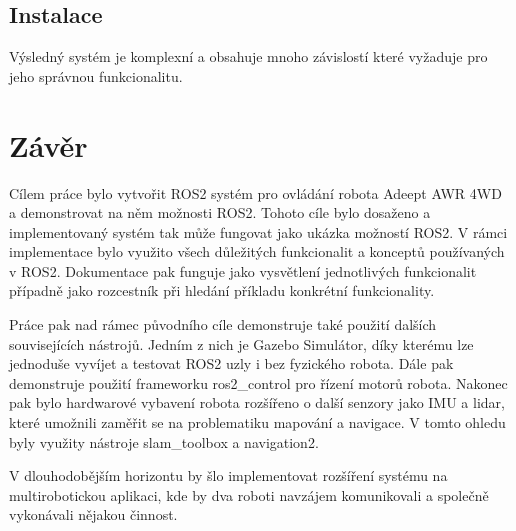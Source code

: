 \section{Instalace}
Výsledný systém je komplexní a obsahuje mnoho závislostí které vyžaduje pro jeho správnou funkcionalitu.

\chapter{Závěr}
Cílem práce bylo vytvořit ROS2 systém pro ovládání robota Adeept AWR 4WD a demonstrovat na něm možnosti ROS2. Tohoto cíle bylo dosaženo a implementovaný systém tak může fungovat jako ukázka možností ROS2. V rámci implementace bylo využito všech důležitých funkcionalit a konceptů používaných v ROS2. Dokumentace pak funguje jako vysvětlení jednotlivých funkcionalit případně jako rozcestník při hledání příkladu konkrétní funkcionality.

Práce pak nad rámec původního cíle demonstruje také použití dalších souvisejících nástrojů. Jedním z nich je Gazebo Simulátor, díky kterému lze jednoduše vyvíjet a testovat ROS2 uzly i bez fyzického robota. Dále pak demonstruje použití frameworku ros2\_control pro řízení motorů robota. Nakonec pak bylo hardwarové vybavení robota rozšířeno o další senzory jako IMU a lidar, které umožnili zaměřit se na problematiku mapování a navigace. V tomto ohledu byly využity nástroje slam\_toolbox a navigation2.

V dlouhodobějším horizontu by šlo implementovat rozšíření systému na multirobotickou aplikaci, kde by dva roboti navzájem komunikovali a společně vykonávali nějakou činnost.


%
